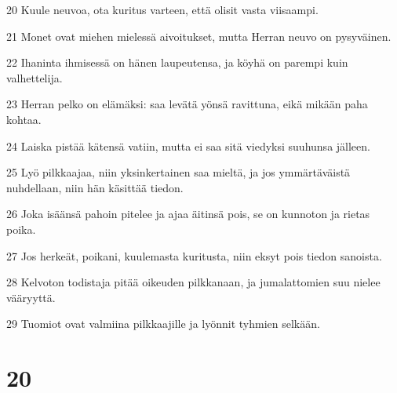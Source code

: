 \par 20 Kuule neuvoa, ota kuritus varteen, että olisit vasta viisaampi.
\par 21 Monet ovat miehen mielessä aivoitukset, mutta Herran neuvo on pysyväinen.
\par 22 Ihaninta ihmisessä on hänen laupeutensa, ja köyhä on parempi kuin valhettelija.
\par 23 Herran pelko on elämäksi: saa levätä yönsä ravittuna, eikä mikään paha kohtaa.
\par 24 Laiska pistää kätensä vatiin, mutta ei saa sitä viedyksi suuhunsa jälleen.
\par 25 Lyö pilkkaajaa, niin yksinkertainen saa mieltä, ja jos ymmärtäväistä nuhdellaan, niin hän käsittää tiedon.
\par 26 Joka isäänsä pahoin pitelee ja ajaa äitinsä pois, se on kunnoton ja rietas poika.
\par 27 Jos herkeät, poikani, kuulemasta kuritusta, niin eksyt pois tiedon sanoista.
\par 28 Kelvoton todistaja pitää oikeuden pilkkanaan, ja jumalattomien suu nielee vääryyttä.
\par 29 Tuomiot ovat valmiina pilkkaajille ja lyönnit tyhmien selkään.

\chapter{20}

